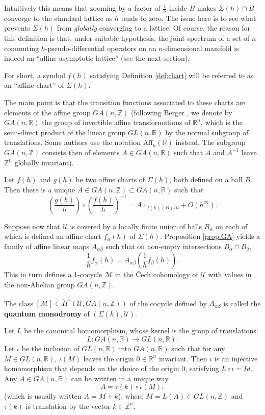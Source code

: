 \documentclass[cmp]{svjour}  %
\newcommand{\fleche}{\rightarrow}
\newcommand{\restr}{\upharpoonright}
\newcommand{\pdo}{pseudo-differential operator}
\newcommand{\RM}{\mathbb{R}}
\newcommand{\ZM}{\mathbb{Z}}
\newcommand{\U}{\mathcal{U}}
\newcommand{\M}{\mathcal{M}}
\begin{document}
Intuitively this means that zooming by a factor of $\frac{1}{h}$
inside $B$ makes $\Sigma(h)\cap B$ converge to the standard lattice as
$h$ tends to zero.  The issue here is to see what prevents $\Sigma(h)$
from \emph{globally} converging to a lattice. Of course, the reason
for this definition is that, under suitable hypothesis, the joint
spectrum of a set of $n$ commuting $h$-\pdo s on an $n$-dimensional
manifold is indeed an ``affine asymptotic lattice'' (see the next
section).

For short, a symbol $f(h)$ satisfying Definition \ref{def:chart} will
be referred to as an ``affine chart'' of $\Sigma(h)$.

The main point is that the transition functions associated to these
charts are elements of the affine group $GA(n,\ZM)$ (following Berger
\cite{berger-affine}, we denote by $GA(n,\RM)$ the group of invertible
affine transformations of $\RM^n$, which is the semi-direct product of
the linear group $GL(n,\RM)$ by the normal subgroup of
translations. Some authors use the notation $\textrm{Aff}_n(\RM)$
instead. The subgroup $GA(n,\ZM)$ consists then of elements $A\in
GA(n,\RM)$ such that $A$ and $A^{-1}$ leave $\ZM^n$ globally
invariant).
\begin{proposition}
  \label{prop:GA}
  Let $f(h)$ and $g(h)$ be two affine charts of $\Sigma(h)$, both
  defined on a ball $B$. Then there is a unique
  $A\in GA(n,\ZM)\subset GA(n,\RM)$ such that
\[ \left(\frac{g(h)}{h}\right)\circ\left(\frac{f(h)}{h}\right)^{-1} =
  A_{\restr f(h)(B)/h} + O(h^\infty).\]
\end{proposition}

Suppose now that $\U$ is covered by a locally finite union of balls
$B_\alpha$ on each of which is defined an affine chart $f_\alpha(h)$
of $\Sigma(h)$. Proposition \ref{prop:GA} yields a family of affine
linear maps $A_{\alpha\beta}$ such that on non-empty intersections
$B_\alpha\cap B_\beta$,
\[ \frac{1}{h}f_\alpha(h) =
A_{\alpha\beta}\left(\frac{1}{h}f_\beta(h)\right).\]
This in turn defines a 1-cocycle $\M$ in the \v Cech cohomology of $\U$
with values in the non-Abelian group $GA(n,\ZM)$.
\begin{definition}
  \label{def:monodromy}
  The class $[\M]\in\check{H}^1(\U,GA(n,\ZM))$ of the cocycle defined by
  $A_{\alpha\beta}$ is called the {\bf quantum monodromy} of
  $(\Sigma(h),\U)$.
\end{definition}

Let $L$ be the canonical homomorphism, whose kernel is the group of
translations:
\[ L : GA(n,\RM) \fleche GL(n,\RM). \]
Let $\iota$ be the inclusion of $GL(n,\RM)$ into $GA(n,\RM)$ such that
for any $M\in GL(n,\RM)$, $\iota(M)$ leaves the origin $0\in\RM^n$
invariant. Then $\iota$ is an injective homomorphism that depends on
the choice of the origin $0$, satisfying $L\circ\iota=Id$. Any $A\in
GA(n,\RM)$ can be written in a unique way
\[   A = \tau(k) \circ \iota(M),\]
(which is usually written $A = M + k$), where $M=L(A)\in GL(n,\ZM)$
and $\tau(k)$ is translation by the vector $k\in\ZM^n$.
\end{document}

